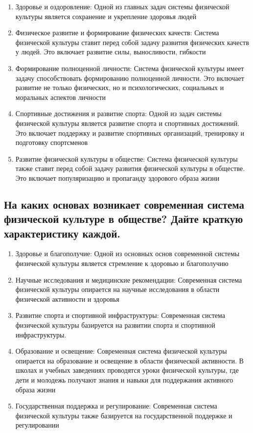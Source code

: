 \begin{enumerate}
    \item Здоровье и оздоровление: Одной из главных задач системы физической культуры является сохранение и укрепление здоровья людей
    \item Физическое развитие и формирование физических качеств: Система физической культуры ставит перед собой задачу развития физических качеств у людей. Это включает развитие силы, выносливости, гибкости
    \item Формирование полноценной личности: Система физической культуры имеет задачу способствовать формированию полноценной личности. Это включает развитие не только физических, но и психологических, социальных и моральных аспектов личности
    \item Спортивные достижения и развитие спорта: Одной из задач системы физической культуры является развитие спорта и спортивных достижений. Это включает поддержку и развитие спортивных организаций, тренировку и подготовку спортсменов
    \item Развитие физической культуры в обществе: Система физической культуры также ставит перед собой задачу развития физической культуры в обществе. Это включает популяризацию и пропаганду здорового образа жизни
\end{enumerate}

\subsection{На каких основах возникает современная система физической культуре в обществе? Дайте краткую характеристику каждой.}

\begin{enumerate}
    \item Здоровье и благополучие: Одной из основных основ современной системы физической культуры является стремление к здоровью и благополучию
    \item Научные исследования и медицинские рекомендации: Современная система физической культуры опирается на научные исследования в области физической активности и здоровья
    \item Развитие спорта и спортивной инфраструктуры: Современная система физической культуры базируется на развитии спорта и спортивной инфраструктуры.
    \item Образование и освещение: Современная система физической культуры опирается на образование и освещение в области физической активности. В школах и учебных заведениях проводятся уроки физической культуры, где дети и молодежь получают знания и навыки для поддержания активного образа жизни
    \item Государственная поддержка и регулирование: Современная система физической культуры также базируется на государственной поддержке и регулировании
\end{enumerate}


